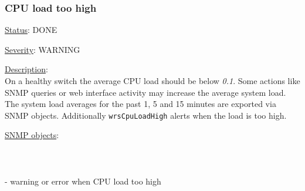 \subsubsection{\bf CPU load too high}
		\label{fail:other:cpu}
		\begin{packed_enum}
			\item [] \underline{Status}: DONE
			\item [] \underline{Severity}: WARNING
			\item [] \underline{Description}:\\
				On a healthy switch the average CPU load should be below \emph{0.1}.
				Some actions like SNMP queries or web interface activity may increase
				the average system load. The system load averages for the past 1, 5 and
				15 minutes are exported via SNMP objects. Additionally
				\texttt{wrsCpuLoadHigh} alerts when the load is too high.
			\item [] \underline{SNMP objects}:\\
				\\
				\\
				\\
				 - warning or error when CPU load too high
		\end{packed_enum}

